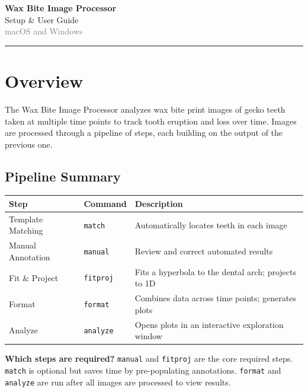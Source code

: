 \documentclass[11pt, letterpaper]{article}
\begin{document}
\begin{center}
  {\LARGE\bfseries Wax Bite Image Processor}\\[6pt]
  {\large Setup \& User Guide}\\[4pt]
  {\small\textcolor{gray}{macOS and Windows}}
\end{center}

\vspace{0.5em}
\hrule
\vspace{1em}

\tableofcontents

\newpage

\section{Overview}

The Wax Bite Image Processor analyzes wax bite print images of gecko teeth taken at multiple
time points to track tooth eruption and loss over time. Images are processed through a pipeline
of steps, each building on the output of the previous one.

\subsection*{Pipeline Summary}

\begin{center}
\begin{tabular}{lll}
\toprule
\textbf{Step} & \textbf{Command} & \textbf{Description} \\
\midrule
Template Matching & \texttt{match}   & Automatically locates teeth in each image \\
Manual Annotation & \texttt{manual}  & Review and correct automated results \\
Fit \& Project    & \texttt{fitproj} & Fits a hyperbola to the dental arch; projects to 1D \\
Format            & \texttt{format}  & Combines data across time points; generates plots \\
Analyze           & \texttt{analyze} & Opens plots in an interactive exploration window \\
\bottomrule
\end{tabular}
\end{center}

\begin{notebox}
\textbf{Which steps are required?} \texttt{manual} and \texttt{fitproj} are the core required steps.
\texttt{match} is optional but saves time by pre-populating annotations. \texttt{format} and
\texttt{analyze} are run after all images are processed to view results.
\end{notebox}
\end{document}
